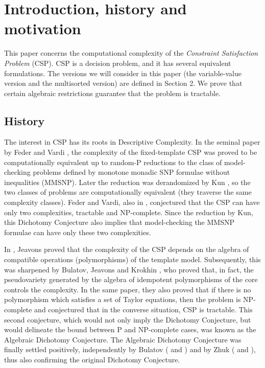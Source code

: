 \documentclass[11pt]{amsart}
\theoremstyle{definition}
\begin{document}
\maketitle


\section{Introduction, history and motivation}

This paper concerns the computational complexity of the {\em Constraint Satisfaction Problem} (CSP). CSP is a decision problem, and it has several equivalent formulations. The versions we will consider in this paper (the variable-value version and the multisorted version) are defined in Section 2. We prove that certain algebraic restrictions guarantee that the problem is tractable.

\subsection{History} 

The interest in CSP has its roots in Descriptive Complexity. In the seminal paper by Feder and Vardi \cite{FV}, the complexity of the fixed-template CSP was proved to be computationally equivalent up to random-P reductions to the class of model-checking problems defined by monotone monadic SNP formulae without inequalities (MMSNP). Later the reduction was derandomized by Kun \cite{K}, so the two classes of problems are computationally equivalent (they traverse the same complexity classes). Feder and Vardi, also in \cite{FV}, conjectured that the CSP can have only two complexities, tractable and NP-complete. Since the reduction by Kun, this Dichotomy Conjecture also implies that model-checking the MMSNP formulae can have only these two complexities.

In \cite{J}, Jeavons proved that the complexity of the CSP depends on the algebra of compatible operations (polymorphisms) of the template model. Subsequently, this was sharpened by Bulatov, Jeavons and Krokhin \cite{BJK}, who proved that, in fact, the pseudovariety generated by the algebra of idempotent polymorphisms of the core controls the complexity. In the same paper, they also proved that if there is no polymorphism which satisfies a set of Taylor equations, then the problem is NP-complete and conjectured that in the converse situation, CSP is tractable. This second conjecture, which would not only imply the Dichotomy Conjecture, but would delineate the bound between P and NP-complete cases, was known as the Algebraic Dichotomy Conjecture. The Algebraic Dichotomy Conjecture was finally settled positively, independently by Bulatov (\cite{Buconf} and \cite{Budich}) and by Zhuk (\cite{Zhconf} and \cite{Zhdich}), thus also confirming the original Dichotomy Conjecture.
\end{document}
